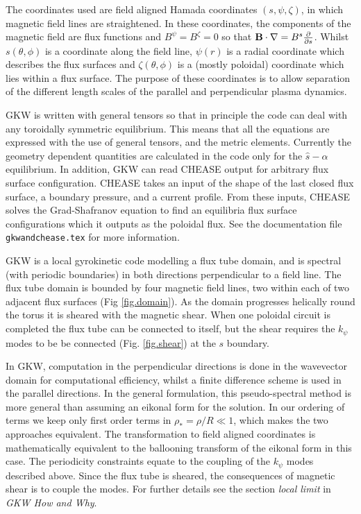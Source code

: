 \documentclass[a4paper,10pt]{article}
\begin{document}
The coordinates used are field aligned Hamada coordinates $(s, \psi, \zeta)$,  in which magnetic field lines are straightened. In these coordinates, the components of the magnetic field are flux functions and $B^\psi = B^\zeta = 0$ so that ${\bf B} \cdot \nabla = B^s {\partial \over \partial s}$.  Whilst $s(\theta,\phi)$ is a coordinate along the field line, $\psi(r)$ is a radial coordinate which describes the flux surfaces and $\zeta(\theta,\phi)$ is a (mostly poloidal) coordinate which lies within a flux surface.  The purpose of these coordinates is to allow separation of the different length scales of the parallel and perpendicular plasma dynamics.

GKW is written with general tensors so that in principle the code can deal with any toroidally symmetric 
equilibrium. This means that all the equations are expressed with the use of general tensors, and 
the metric elements. Currently  the geometry dependent quantities are calculated in the code only for the $\hat s - \alpha$ equilibrium. In addition, GKW can read CHEASE output for arbitrary flux surface configuration. CHEASE takes an input of the shape of the last closed flux surface, a boundary pressure, and a current profile. From these inputs, CHEASE solves the Grad-Shafranov equation to find an equilibria flux surface configurations which it outputs as the poloidal flux. See the documentation file \texttt{gkwandchease.tex} for more information.

GKW is a local gyrokinetic code modelling a flux tube domain, and is spectral (with periodic boundaries) in both directions perpendicular to a field line.  The flux tube domain is bounded by four magnetic field lines, two within each of two adjacent flux surfaces (Fig \ref{fig.domain}). As the domain progresses helically round the torus it is sheared with the magnetic shear.  When one poloidal circuit is completed the flux tube can be connected to itself, but the shear requires the $k_\psi$ modes to be be connected (Fig. \ref{fig.shear}) at the $s$ boundary.

In GKW, computation in the perpendicular directions is done in the wavevector domain for computational efficiency, whilst a finite difference scheme is used in the parallel directions.  In the general formulation, this pseudo-spectral method is more general than assuming an eikonal form for the solution. In our ordering of terms we keep only first order terms in $\rho_*=\rho/R \ll 1$, which makes the two approaches equivalent.  The transformation to field aligned coordinates is mathematically equivalent to the ballooning transform of the eikonal form in this case. The periodicity constraints equate to the coupling of the $k_\psi$ modes described above.  Since the flux tube is sheared, the consequences of magnetic shear is to couple the modes.  For further details see the section \textit{local limit} in \textit{GKW How and Why}.
\end{document}

